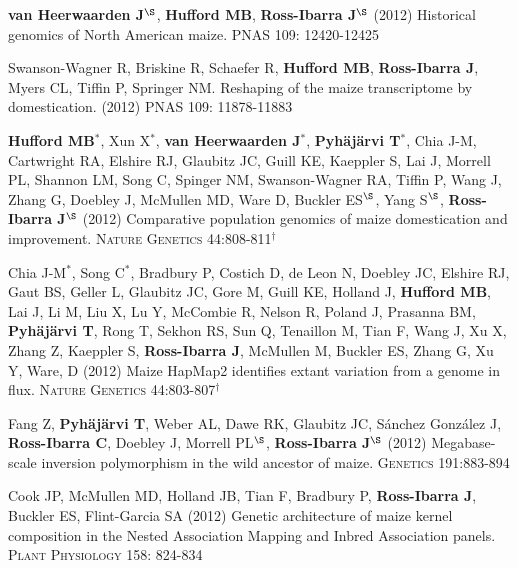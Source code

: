 \documentclass[letterpaper]{article}
\begin{document}
\begin{etaremune}
\item  {\bf van Heerwaarden J}$^\S$, {\bf Hufford MB}, {\bf Ross-Ibarra J}$^\S$ (2012) Historical genomics of North American maize. \textsc{PNAS} 109: 12420-12425
\\%

\item Swanson-Wagner R, Briskine R, Schaefer R, {\bf Hufford MB}, {\bf Ross-Ibarra J}, Myers CL, Tiffin P, Springer NM.  Reshaping of the maize transcriptome by domestication. (2012) \textsc{PNAS}  109: 11878-11883
\\%

\item {\bf Hufford MB}$^*$, Xun X$^*$, {\bf van Heerwaarden J}$^*$, {\bf Pyh\"aj\"arvi T}$^*$, Chia J-M, Cartwright RA, Elshire RJ, Glaubitz JC, Guill KE, Kaeppler S, Lai J, Morrell PL, Shannon LM, Song C, Spinger NM, Swanson-Wagner RA, Tiffin P, Wang J, Zhang G, Doebley J, McMullen MD, Ware D, Buckler ES$^\S$, Yang S$^\S$, {\bf Ross-Ibarra J}$^\S$ (2012) Comparative population genomics of maize domestication and improvement. \textsc{Nature Genetics} 44:808-811$^\dagger$
\\%

\item  Chia J-M$^*$, Song C$^*$, Bradbury P, Costich D, de Leon N, Doebley JC, Elshire RJ, Gaut BS, Geller L, Glaubitz JC, Gore M, Guill KE, Holland J,  {\bf Hufford MB}, Lai J, Li M, Liu X, Lu Y, McCombie R, Nelson R, Poland J, Prasanna BM,  {\bf Pyh\"aj\"arvi T}, Rong T, Sekhon RS,  Sun Q, Tenaillon M, Tian F, Wang J, Xu X, Zhang Z, Kaeppler S, {\bf Ross-Ibarra J}, McMullen M, Buckler ES, Zhang G, Xu Y, Ware, D (2012) Maize HapMap2 identifies extant variation from a genome in flux. \textsc{Nature Genetics} 44:803-807$^\dagger$
\\%

\item Fang Z, {\bf Pyh\"aj\"arvi T}, Weber AL, Dawe RK, Glaubitz JC, S\'{a}nchez Gonz\'{a}lez J, {\bf Ross-Ibarra C}, Doebley J, Morrell PL$^\S$, {\bf Ross-Ibarra J}$^\S$  (2012) Megabase-scale inversion polymorphism in the wild ancestor of maize. \textsc{Genetics} 191:883-894 
\\%

\item Cook JP, McMullen MD, Holland JB, Tian F, Bradbury P, {\bf Ross-Ibarra J}, Buckler ES, Flint-Garcia SA (2012) Genetic architecture of maize kernel composition in the Nested Association Mapping and Inbred Association panels.  \textsc{Plant Physiology} 158: 824-834
\\%


\end{etaremune}
\end{document}
